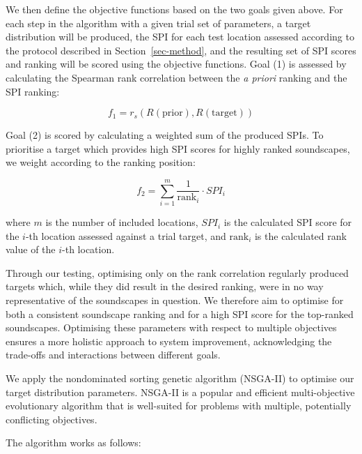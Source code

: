 \documentclass[
  authoryear,
  preprint,
  3p]{elsarticle}
\begin{document}
We then define the objective functions based on the two goals given
above. For each step in the algorithm with a given trial set of
parameters, a target distribution will be produced, the SPI for each
test location assessed according to the protocol described in
Section~\ref{sec-method}, and the resulting set of SPI scores and
ranking will be scored using the objective functions. Goal (1) is
assessed by calculating the Spearman rank correlation between the
\emph{a priori} ranking and the SPI ranking:

\[
f_1 = r_{s}(R(\text{prior}), R(\text{target}))
\]

Goal (2) is scored by calculating a weighted sum of the produced SPIs.
To prioritise a target which provides high SPI scores for highly ranked
soundscapes, we weight according to the ranking position:

\[
f_2 = \sum_{i=1}^m \frac{1}{\text{rank}_i} \cdot SPI_i
\]

where \(m\) is the number of included locations, \(SPI_i\) is the
calculated SPI score for the \(i\)-th location assessed against a trial
target, and \(\text{rank}_i\) is the calculated rank value of the
\(i\)-th location.

Through our testing, optimising only on the rank correlation regularly
produced targets which, while they did result in the desired ranking,
were in no way representative of the soundscapes in question. We
therefore aim to optimise for both a consistent soundscape ranking and
for a high SPI score for the top-ranked soundscapes. Optimising these
parameters with respect to multiple objectives ensures a more holistic
approach to system improvement, acknowledging the trade-offs and
interactions between different goals.

We apply the nondominated sorting genetic algorithm (NSGA-II)
\citep{Deb2002fast} to optimise our target distribution parameters.
NSGA-II is a popular and efficient multi-objective evolutionary
algorithm that is well-suited for problems with multiple, potentially
conflicting objectives.

The algorithm works as follows:
\end{document}
